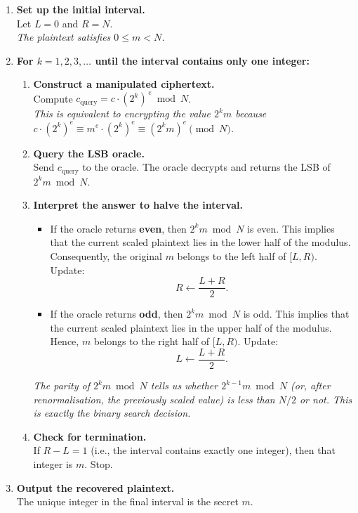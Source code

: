 \begin{enumerate}
\item \textbf{Set up the initial interval.} \\
   Let \(L = 0\) and \(R = N\). \\
   \emph{The plaintext satisfies \(0 \le m < N\).}

\item \textbf{For \(k = 1, 2, 3, \dots\) until the interval contains only one integer:}

   \begin{enumerate}
   \item \textbf{Construct a manipulated ciphertext.} \\
      Compute \(c_{\text{query}} = c \cdot (2^{k})^{\,e} \bmod N\). \\
      \emph{This is equivalent to encrypting the value \(2^k m\) because} \\
      \emph{\(c \cdot (2^k)^e \equiv m^e \cdot (2^k)^e \equiv (2^k m)^e \pmod{N}\).}

   \item \textbf{Query the LSB oracle.} \\
      Send \(c_{\text{query}}\) to the oracle. The oracle decrypts and returns the LSB of \(2^k m \bmod N\).

   \item \textbf{Interpret the answer to halve the interval.} \\
      \begin{itemize}
      \item If the oracle returns \textbf{even}, then \(2^k m \bmod N\) is even. This implies that the current scaled plaintext lies in the lower half of the modulus. Consequently, the original \(m\) belongs to the left half of \([L, R)\). Update:
         \[
         R \leftarrow \frac{L+R}{2}.
         \]
      \item If the oracle returns \textbf{odd}, then \(2^k m \bmod N\) is odd. This implies that the current scaled plaintext lies in the upper half of the modulus. Hence, \(m\) belongs to the right half of \([L, R)\). Update:
         \[
         L \leftarrow \frac{L+R}{2}.
         \]
      \end{itemize}
      \emph{The parity of \(2^k m \bmod N\) tells us whether \(2^{k-1}m \bmod N\) (or, after renormalisation, the previously scaled value) is less than \(N/2\) or not. This is exactly the binary search decision.}

   \item \textbf{Check for termination.} \\
      If \(R - L = 1\) (i.e., the interval contains exactly one integer), then that integer is \(m\). Stop.
   \end{enumerate}

\item \textbf{Output the recovered plaintext.} \\
   The unique integer in the final interval is the secret \(m\).
\end{enumerate}

